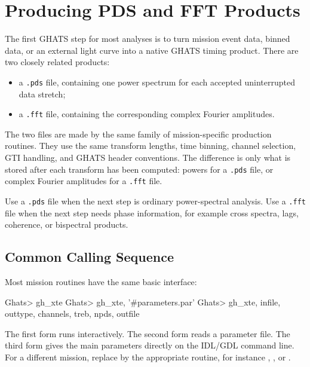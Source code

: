 \chapter{Producing PDS and FFT Products}

The first GHATS step for most analyses is to turn mission event data, binned
data, or an external light curve into a native GHATS timing product.  There
are two closely related products:

\begin{itemize}
\item a \texttt{.pds} file, containing one power spectrum for each accepted
  uninterrupted data stretch;
\item a \texttt{.fft} file, containing the corresponding complex Fourier
  amplitudes.
\end{itemize}

The two files are made by the same family of mission-specific production
routines.  They use the same transform lengths, time binning, channel
selection, GTI handling, and GHATS header conventions.  The difference is only
what is stored after each transform has been computed: powers for a
\texttt{.pds} file, or complex Fourier amplitudes for a \texttt{.fft} file.

\begin{ghatsnote}
Use a \texttt{.pds} file when the next step is ordinary power-spectral
analysis.  Use a \texttt{.fft} file when the next step needs phase information,
for example cross spectra, lags, coherence, or bispectral products.
\end{ghatsnote}

\section{Common Calling Sequence}

Most mission routines have the same basic interface:

\begin{ghatsconsole}
Ghats> gh_xte
Ghats> gh_xte, '#parameters.par'
Ghats> gh_xte, infile, outtype, channels, treb, npds, outfile
\end{ghatsconsole}

The first form runs interactively.  The second form reads a parameter file.
The third form gives the main parameters directly on the IDL/GDL command line.
For a different mission, replace  by the appropriate routine,
for instance , , or .

